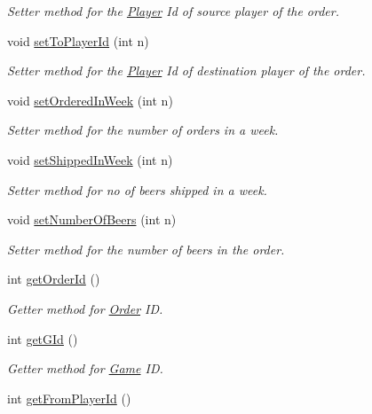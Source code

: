 \begin{DoxyCompactItemize}
\begin{DoxyCompactList}\small\item\em Setter method for the \hyperlink{class_player}{Player} Id of source player of the order. \end{DoxyCompactList}\item 
void \hyperlink{class_order_aea921d19a1a5451eccc92b457c952fba}{set\+To\+Player\+Id} (int n)
\begin{DoxyCompactList}\small\item\em Setter method for the \hyperlink{class_player}{Player} Id of destination player of the order. \end{DoxyCompactList}\item 
void \hyperlink{class_order_aba9a5987294110e6f6dea45feb88c31a}{set\+Ordered\+In\+Week} (int n)
\begin{DoxyCompactList}\small\item\em Setter method for the number of orders in a week. \end{DoxyCompactList}\item 
void \hyperlink{class_order_aac9de21348f84e2556101d52c0ec53af}{set\+Shipped\+In\+Week} (int n)
\begin{DoxyCompactList}\small\item\em Setter method for no of beers shipped in a week. \end{DoxyCompactList}\item 
void \hyperlink{class_order_a5df5676cf7fc84374b5bdb5789aaf2f5}{set\+Number\+Of\+Beers} (int n)
\begin{DoxyCompactList}\small\item\em Setter method for the number of beers in the order. \end{DoxyCompactList}\item 
int \hyperlink{class_order_aa5042da754f07b1876aa63615c5f2983}{get\+Order\+Id} ()
\begin{DoxyCompactList}\small\item\em Getter method for \hyperlink{class_order}{Order} ID. \end{DoxyCompactList}\item 
int \hyperlink{class_order_a89b55df1654ff4cb9db6608fc88c86ed}{get\+G\+Id} ()
\begin{DoxyCompactList}\small\item\em Getter method for \hyperlink{class_game}{Game} ID. \end{DoxyCompactList}\item 
int \hyperlink{class_order_a1d6ae1f551053272307fde77c2cffa58}{get\+From\+Player\+Id} ()

\end{DoxyCompactItemize}

